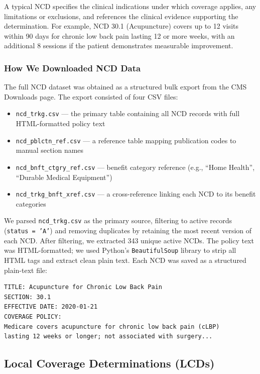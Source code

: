 \documentclass[12pt, letterpaper]{article}
\begin{document}
A typical NCD specifies the clinical indications under which coverage applies, any
limitations or exclusions, and references the clinical evidence supporting the
determination. For example, NCD 30.1 (Acupuncture) covers up to 12 visits within
90 days for chronic low back pain lasting 12 or more weeks, with an additional 8
sessions if the patient demonstrates measurable improvement.

\subsubsection{How We Downloaded NCD Data}

The full NCD dataset was obtained as a structured bulk export from the CMS Downloads
page. The export consisted of four CSV files:

\begin{itemize}[noitemsep, topsep=4pt]
    \item \texttt{ncd\_trkg.csv} --- the primary table containing all NCD records with
          full HTML-formatted policy text
    \item \texttt{ncd\_pblctn\_ref.csv} --- a reference table mapping publication codes
          to manual section names
    \item \texttt{ncd\_bnft\_ctgry\_ref.csv} --- benefit category reference (e.g.,
          ``Home Health'', ``Durable Medical Equipment'')
    \item \texttt{ncd\_trkg\_bnft\_xref.csv} --- a cross-reference linking each NCD
          to its benefit categories
\end{itemize}

We parsed \texttt{ncd\_trkg.csv} as the primary source, filtering to active records
(\texttt{status = 'A'}) and removing duplicates by retaining the most recent version
of each NCD. After filtering, we extracted 343 unique active NCDs. The policy text
was HTML-formatted; we used Python's \texttt{BeautifulSoup} library to strip all HTML
tags and extract clean plain text. Each NCD was saved as a structured plain-text file:

\begin{verbatim}
TITLE: Acupuncture for Chronic Low Back Pain
SECTION: 30.1
EFFECTIVE DATE: 2020-01-21
COVERAGE POLICY:
Medicare covers acupuncture for chronic low back pain (cLBP)
lasting 12 weeks or longer; not associated with surgery...
\end{verbatim}

\subsection{Local Coverage Determinations (LCDs)}
\end{document}

